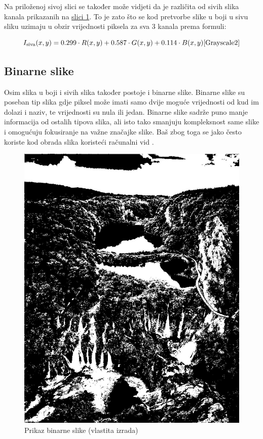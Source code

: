 \documentclass{foi}
\begin{document}
Na priloženoj sivoj slici se također može vidjeti da je različita od sivih slika kanala prikazanih na \hyperref[fig:channels]{slici 1}. To je zato što se kod pretvorbe slike u boji u sivu sliku uzimaju u obzir vrijednosti piksela za sva 3 kanala prema formuli:

{\large
\[
    I_{\text{siva}}(x, y) = 0.299 \cdot R(x, y) + 0.587 \cdot G(x, y) + 0.114 \cdot B(x, y)\text{\cite{Grayscale2}}
\]
}


\subsection{Binarne slike}

Osim slika u boji i sivih slika također postoje i binarne slike. Binarne slike su poseban tip slika gdje piksel može imati samo dvije moguće vrijednosti od kud im dolazi i naziv, te vrijednosti su nula ili jedan. Binarne slike sadrže puno manje informacija od ostalih tipova slika, ali isto tako smanjuju kompleksnost same slike i omogućuju fokusiranje na važne značajke slike. Baš zbog toga se jako često koriste kod obrada slika koristeći računalni vid \cite{BinarySlika}.

\begin{figure}[H]
    \centering
    \includegraphics[width=0.75\linewidth]{slike/Binary.jpeg}
    \caption{Prikaz binarne slike (vlastita izrada)}
\end{figure}
\end{document}
